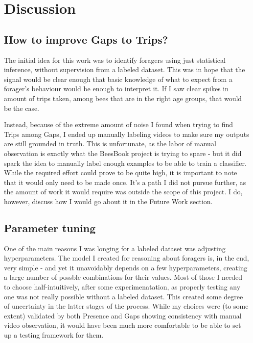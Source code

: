 
\chapter{Discussion}  %

\ifpdf
    \graphicspath{{Chapters/Chapter5/Figs/Raster/}{Chapters/Chapter5/Figs/PDF/}{Chapters/Chapter5/Figs/}}
\else
    \graphicspath{{Chapters/Chapter5/Figs/Vector/}{Chapters/Chapter5/Figs/}}
\fi


\section{How to improve Gaps to Trips?}

The initial idea for this work was to identify foragers using just statistical inference, without supervision from a labeled dataset. This was in hope that the 
signal would be clear enough that basic knowledge of what to expect from a forager's behaviour
would be enough to interpret it. If I saw clear spikes in amount of trips taken, among bees that are in the right age groups, that would be the case.

Instead, because of the extreme amount of noise I found when trying to find Trips among Gaps, I ended up manually labeling videos to make sure my outputs are still grounded in truth. This is unfortunate, 
as the labor of manual observation is exactly what the BeesBook project is trying to spare - but it did spark the idea to manually label enough examples to be able to train a classifier. While the required effort could prove to be quite high, it is important to note that it would only need to be made once. It's a path I did not pursue further, as the amount of work it would require was outside the scope of this project. I do, however, discuss how I would go about it in the Future Work section. %

\section{Parameter tuning}

One of the main reasons I was longing for a labeled dataset was adjusting hyperparameters. The model I created for reasoning about foragers is, in the end, very simple - and yet it unavoidably depends on a few hyperparameters, creating a large number of possble combinations for their values. Most of those I needed to choose half-intuitively, after some experimenatation, as properly testing any one was not really possible without a labeled dataset. This created some degree of uncertainty in the latter stages of the process. While my choices were (to some extent) validated by both Presence and Gaps showing consistency with manual video observation, it would have been much more comfortable to be able to set up a testing framework for them.


